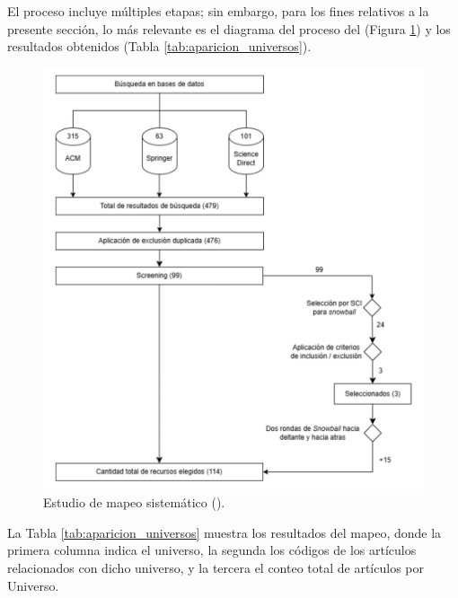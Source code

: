 El proceso incluye múltiples etapas; sin embargo, para los fines relativos a la presente sección, lo más relevante es el diagrama del proceso del \SMS (Figura \ref{fig:sms}) y los resultados obtenidos (Tabla \ref{tab:aparicion_universos}).


\begin{figure}[H]
	\centering
	\includegraphics[scale=0.4]{tablas-images/dar/resumen-mapeo.png}
	\caption{Estudio de mapeo sistemático (\SMS).}
	\label{fig:sms}
\end{figure}

La Tabla \ref{tab:aparicion_universos} muestra los resultados del mapeo, donde la primera columna indica el universo, la segunda los códigos de los artículos relacionados con dicho universo, y la tercera el conteo total de artículos por Universo.

